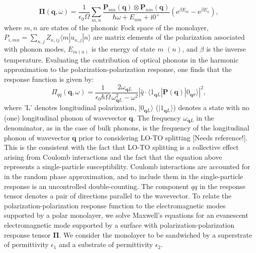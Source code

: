 \documentclass[aps,prb,twocolumn,
	groupedaddress,superscriptaddress,
	amsfonts,amssymb,amsmath,floatfix,
	citeautoscript]{revtex4-1}
\newcommand{\iu}{\mathrm{i}}
\newcommand{\e}{\mathrm{e}}
\begin{document}
\begin{equation}\label{eq:2dsusceptibility}
\boldsymbol{\Pi}(\mathbf{q},\omega) =  \frac{1}{\epsilon_0 \Omega}\sum\limits_{m,n}\frac{\mathbf{P}_{mn}(\mathbf{q})\otimes\mathbf{P}_{nm}(\mathbf{q})}{\hbar\omega + E_{nm}+\iu 0^+}\left(\e^{\beta E_m}-\e^{\beta E_n} \right),
\end{equation}
where $m,n$ are states of the phononic Fock space of the monolayer, $P_{i,mn} = \sum\limits_{\kappa,j}Z_{\kappa,ij}\langle m | u_{\kappa,j} | n \rangle$ are matrix elements of the polarization associated with phonon modes, $E_{m (n)}$ is the energy of state $m$ $(n)$, and $\beta$ is the inverse temperature. Evaluating the contribution of optical phonons in the harmonic approximation to the polarization-polarization response, one finds that the response function is given by: 
\begin{equation}
\Pi_{qq}(\mathbf{q},\omega) = \frac{1}{\epsilon_0\hbar\Omega} \frac{2\omega_{\mathbf{q}L}}{\omega^2_{\mathbf{q}L}-\omega^2}|\hat{q}\cdot\langle 1_{\mathbf{q}L}|\mathbf{P}(\mathbf{q})|0_{\mathbf{q}\sigma}\rangle|^2,
\end{equation}
where 'L' denotes longitudinal polarization, $|0_{\mathbf{q}L}\rangle$ ($|1_{\mathbf{q}L}\rangle$) denotes a state with no (one) longitudinal phonon of wavevector $\mathbf{q}$. The frequency $\omega_{\mathbf{q}L}$ in the denominator, as in the case of bulk phonons, is the frequency of the longitudinal phonon of wavevector $\mathbf{q}$ prior to considering LO-TO splitting [Needs reference!]. This is the consistent with the fact that LO-TO splitting is a collective effect arising from Coulomb interactions and the fact that the equation above represents a single-particle susceptibility. Coulomb interactions are accounted for in the random phase approximation, and to include them in the single-particle response is an uncontrolled double-counting. The component $qq$ in the response tensor denotes a pair of directions parallel to the wavevector.  
To relate the polarization-polarization response function to the electromagnetic modes supported by a polar monolayer, we solve Maxwell's equations for an evanescent electromagnetic mode supported by a surface with polarization-polarization response tensor $\mathbf{\Pi}$. We consider the monolayer to be sandwiched by a superstrate of permittivity $\epsilon_1$ and a substrate of permittivity $\epsilon_2$.
\end{document}
